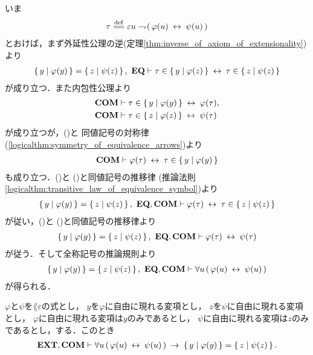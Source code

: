 	\begin{sketch}
		いま
		\begin{align}
			\tau \defeq \varepsilon u \negation (\, \varphi(u) \lrarrow \psi(u)\, )
		\end{align}
		とおけば，まず外延性公理の逆(定理\ref{thm:inverse_of_axiom_of_extensionality})より
		\begin{align}
			\left\{\, y \mid \varphi(y)\, \right\} = \left\{\, z \mid \psi(z)\, \right\},\ \mbox{{\bf EQ}} \vdash 
			\tau \in \left\{\, y \mid \varphi(z)\, \right\} \hspace{0.25em}\leftrightarrow\hspace{0.25em} \tau \in \left\{\, z \mid \psi(z)\, \right\}
			\label{fom:equivalent_formula_rewriting_5_1}
		\end{align}
		が成り立つ．また内包性公理より
		\begin{align}
			\mbox{\bf COM} &\vdash \tau \in \left\{\, y \mid \varphi(y)\, \right\} \hspace{0.25em}\leftrightarrow\hspace{0.25em} \varphi(\tau), 
			\label{fom:equivalent_formula_rewriting_5_2} \\
			\mbox{\bf COM} &\vdash \tau \in \left\{\, z \mid \varphi(z)\, \right\} \hspace{0.25em}\leftrightarrow\hspace{0.25em} \psi(\tau)
			\label{fom:equivalent_formula_rewriting_5_3}
		\end{align}
		が成り立つが，()と
		同値記号の対称律(\ref{logicalthm:symmetry_of_equivalence_arrows})より
		\begin{align}
			\mbox{\bf COM} \vdash \varphi(\tau) \hspace{0.25em}\leftrightarrow\hspace{0.25em} \tau \in \left\{\, y \mid \varphi(y)\, \right\}
			\label{fom:equivalent_formula_rewriting_5_4}
		\end{align}
		も成り立つ．()と
		()と同値記号の推移律
		(推論法則\ref{logicalthm:transitive_law_of_equivalence_symbol})より
		\begin{align}
			\left\{\, y \mid \varphi(y)\, \right\} = \left\{\, z \mid \psi(z)\, \right\},\ \mbox{{\bf EQ}},\mbox{\bf COM} \vdash
			 \varphi(\tau) \hspace{0.25em}\leftrightarrow\hspace{0.25em} \tau \in \left\{\, z \mid \psi(z)\, \right\}
			\label{fom:equivalent_formula_rewriting_5_5}
		\end{align}
		が従い，()と
		()と同値記号の推移律より
		\begin{align}
			\left\{\, y \mid \varphi(y)\, \right\} = \left\{\, z \mid \psi(z)\, \right\},\ \mbox{{\bf EQ}},\mbox{\bf COM} \vdash
			\varphi(\tau) \hspace{0.25em}\leftrightarrow\hspace{0.25em} \psi(\tau)
		\end{align}
		が従う．そして全称記号の推論規則より
		\begin{align}
			\left\{\, y \mid \varphi(y)\, \right\} = \left\{\, z \mid \psi(z)\, \right\},\ \mbox{{\bf EQ}},\mbox{\bf COM} \vdash
			\forall u\, (\, \varphi(u) \hspace{0.25em}\leftrightarrow\hspace{0.25em} \psi(u)\, )
		\end{align}
		が得られる．
		\QED
	\end{sketch}
	
	\begin{screen}
		\begin{thm}
		\label{thm:equivalent_formula_rewriting_6}
			$\varphi$と$\psi$を$\lang{\varepsilon}$の式とし，
			$y$を$\varphi$に自由に現れる変項とし，
			$z$を$\psi$に自由に現れる変項とし，
			$\varphi$に自由に現れる変項は$y$のみであるとし，
			$\psi$に自由に現れる変項は$z$のみであるとし，する．このとき
			\begin{align}
				\mbox{{\bf EXT}},\mbox{\bf COM} \vdash \forall u\, (\, \varphi(u) \hspace{0.25em}\leftrightarrow\hspace{0.25em} \psi(u)\, )
				\hspace{0.25em}\rightarrow\hspace{0.25em} \left\{\, y \mid \varphi(y)\, \right\} = \left\{\, z \mid \psi(z)\, \right\}.
			\end{align}
		\end{thm}
	\end{screen}
	
